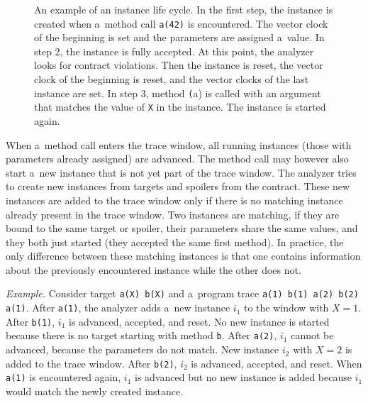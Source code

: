 \begin{figure}[hbt]
    \begin{center}
        \label{instanceLifeCycle}
        
        
        
        
        \caption{An example of an instance life cycle. In the first step, the
        instance is created when a~method call \texttt{a(42)} is encountered.
        The vector clock of the beginning is set and the parameters are assigned
        a~value. In step 2, the instance is fully accepted. At this point, the
        analyzer looks for contract violations. Then the instance is reset, the
        vector clock of the beginning is reset, and the vector clocks of the
        last instance are set. In step 3, method \texttt(a) is called with an
        argument that matches the value of \texttt{X} in the instance. The
        instance is started again.}
    \end{center}
\end{figure}

When a~method call enters the trace window, all running instances (those with
parameters already assigned) are advanced. The method call may however also
start a~new instance that is not yet part of the trace window. The analyzer
tries to create new instances from targets and spoilers from the contract. These
new instances are added to the trace window only if there is no matching
instance already present in the trace window. Two instances are matching, if
they are bound to the same target or spoiler, their parameters share the same
values, and they both just started (they accepted the same first method). In
practice, the only difference between these matching instances is that one
contains information about the previously encountered instance while the other
does not.

\emph{Example.} Consider target \texttt{a(X) b(X)} and a~program trace
\texttt{a(1) b(1) a(2) b(2) a(1)}. After \texttt{a(1)}, the analyzer adds a~new
instance $i_1$ to the window with $X=1$. After \texttt{b(1)}, $i_1$ is advanced,
accepted, and reset. No new instance is started because there is no target
starting with method \texttt{b}. After \texttt{a(2)}, $i_1$ cannot be advanced,
because the parameters do not match. New instance $i_2$ with $X=2$ is added to
the trace window. After \texttt{b(2)}, $i_2$ is advanced, accepted, and reset.
When \texttt{a(1)} is encountered again, $i_1$ is advanced but no new instance
is added because $i_1$ would match the newly created instance.

